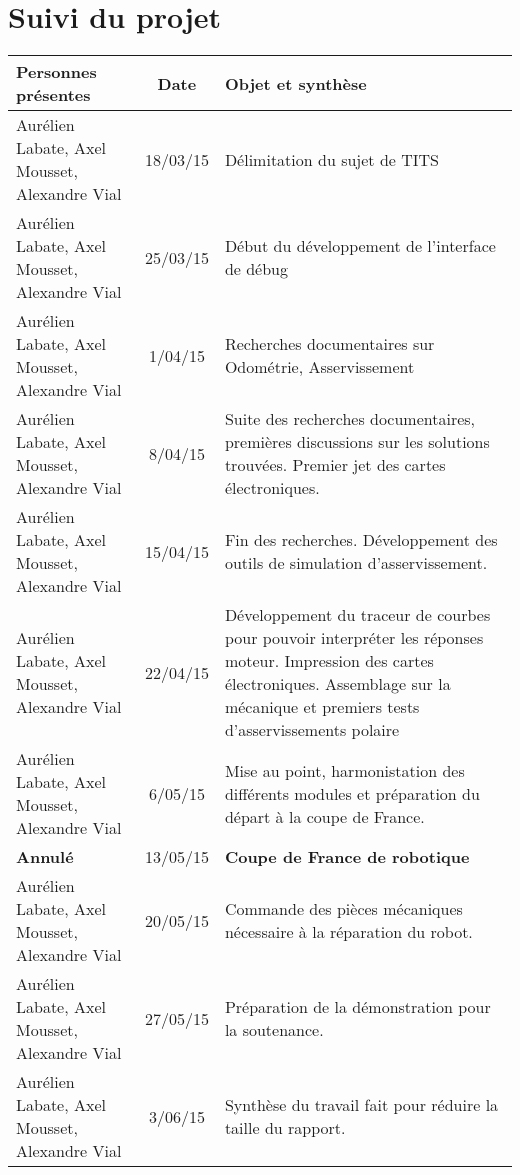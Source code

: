 \chapter{Suivi du projet}
    \begin{tabular}{|p{3cm}|c|p{10cm}|}
        \hline
        Personnes présentes & Date & Objet et synthèse\\
        \hline
        \hline
        Aurélien Labate, Axel Mousset, Alexandre Vial & 18/03/15 & Délimitation du sujet de TITS\\
        \hline
        Aurélien Labate, Axel Mousset, Alexandre Vial & 25/03/15 & Début du développement de l'interface de débug\\
        \hline
        Aurélien Labate, Axel Mousset, Alexandre Vial & 1/04/15 & Recherches documentaires sur Odométrie, Asservissement\\
        \hline
        Aurélien Labate, Axel Mousset, Alexandre Vial & 8/04/15 & Suite des recherches documentaires, premières discussions sur les solutions trouvées. Premier jet des cartes électroniques.\\
        \hline
        Aurélien Labate, Axel Mousset, Alexandre Vial & 15/04/15 & Fin des recherches. Développement des outils de simulation d'asservissement.\\
        \hline
        Aurélien Labate, Axel Mousset, Alexandre Vial & 22/04/15 & Développement du traceur de courbes pour pouvoir interpréter les réponses moteur. Impression des cartes électroniques. Assemblage sur la mécanique et premiers tests d'asservissements polaire\\
        \hline
        Aurélien Labate, Axel Mousset, Alexandre Vial & 6/05/15 & Mise au point, harmonistation des différents modules et préparation du départ à la coupe de France.\\
        \hline
        \textbf{Annulé} & 13/05/15 & \textbf{Coupe de France de robotique}\\
        \hline
        Aurélien Labate, Axel Mousset, Alexandre Vial & 20/05/15 & Commande des pièces mécaniques nécessaire à la réparation du robot.\\
        \hline
        Aurélien Labate, Axel Mousset, Alexandre Vial & 27/05/15 & Préparation de la démonstration pour la soutenance.\\
        \hline
        Aurélien Labate, Axel Mousset, Alexandre Vial & 3/06/15 & Synthèse du travail fait pour réduire la taille du rapport.\\
        \hline
     \end{tabular}


